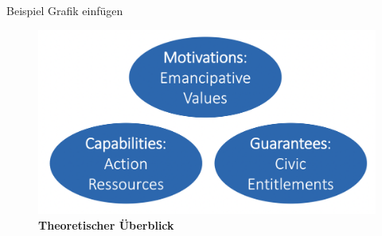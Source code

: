 \documentclass[11pt]{beamer}
\begin{document}
\begin{frame}{Beispiel Grafik einfügen}
	\begin{figure}[ht]
		\includegraphics[width=\textwidth]{pics/s9-1.png}
		\caption{\textbf{Theoretischer Überblick}}
	\end{figure}
\end{frame}
\end{document}

